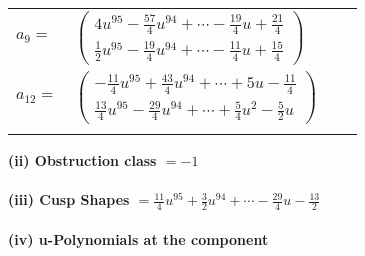 \documentclass[1p]{elsarticle_modified}
\theoremstyle{definition}
\begin{document}
\begin{tabular}{m{7pt} m{180pt} m{7pt} m{180pt} }
\flushright $a_{9}=$&$\begin{pmatrix}4 u^{95}-\frac{57}{4} u^{94}+\cdots-\frac{19}{4} u+\frac{21}{4}\\\frac{1}{2} u^{95}-\frac{19}{4} u^{94}+\cdots-\frac{11}{4} u+\frac{15}{4}\end{pmatrix}$ \\
\flushright $a_{12}=$&$\begin{pmatrix}-\frac{11}{4} u^{95}+\frac{43}{4} u^{94}+\cdots+5 u-\frac{11}{4}\\\frac{13}{4} u^{95}-\frac{29}{4} u^{94}+\cdots+\frac{5}{4} u^2-\frac{5}{2} u\end{pmatrix}$\\&\end{tabular}
\flushleft \textbf{(ii) Obstruction class $= -1$}\\~\\
\flushleft \textbf{(iii) Cusp Shapes $= \frac{11}{4} u^{95}+\frac{3}{2} u^{94}+\cdots-\frac{29}{4} u-\frac{13}{2}$}\\~\\
\newpage\renewcommand{\arraystretch}{1}
\flushleft \textbf{(iv) u-Polynomials at the component}\newline \\
\end{document}
